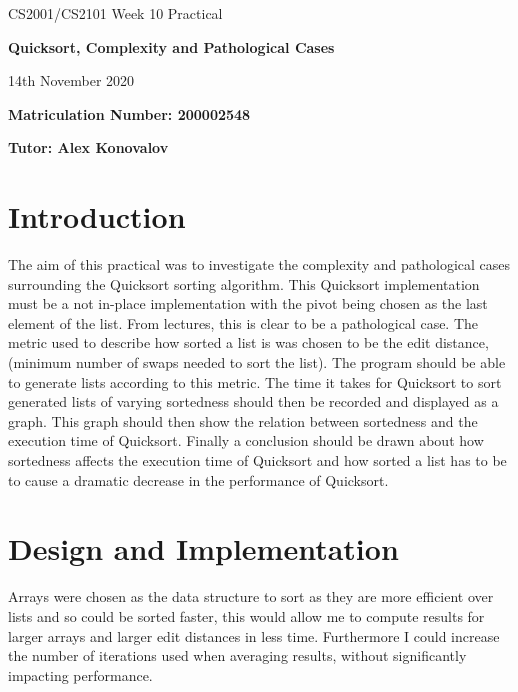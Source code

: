 \documentclass{article}
\begin{document}
\nocite{*}

\begin{center}
\Huge 
CS2001/CS2101 Week 10 Practical

\vspace{0.5cm}

\textbf{Quicksort, Complexity and Pathological Cases}

\vspace{1cm}
\LARGE
14th November 2020

\large
\vspace{1.5cm}

\textbf{Matriculation Number: 200002548}

\vspace{0.5cm}

\textbf{Tutor: Alex Konovalov}

\end{center}

\vspace*{3cm}

\tableofcontents

\newpage
\section{Introduction}
The aim of this practical was to investigate the complexity and pathological cases surrounding the Quicksort sorting algorithm. This Quicksort implementation must be a not in-place implementation with the pivot being chosen as the last element of the list. From lectures, this is clear to be a pathological case. The metric used to describe how sorted a list is was chosen to be the edit distance, (minimum number of swaps needed to sort the list). The program should be able to generate lists according to this metric. The time it takes for Quicksort to sort generated lists of varying sortedness should then be recorded and displayed as a graph. This graph should then show the relation between sortedness and the execution time of Quicksort. Finally a conclusion should be drawn about how sortedness affects the execution time of Quicksort and how sorted a list has to be to cause a dramatic decrease in the performance of Quicksort.

\section{Design and Implementation}
Arrays were chosen as the data structure to sort as they are more efficient over lists and so could be sorted faster, this would allow me to compute results for larger arrays and larger edit distances in less time. Furthermore I could increase the number of iterations used when averaging results, without significantly impacting performance.
\end{document}
